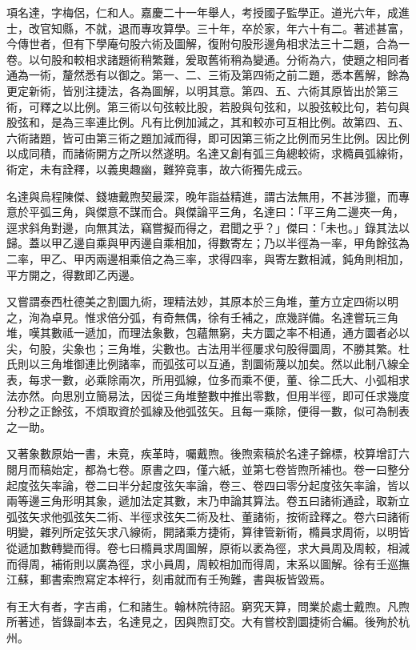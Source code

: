 \begin{pinyinscope}
項名達，字梅侶，仁和人。嘉慶二十一年舉人，考授國子監學正。道光六年，成進士，改官知縣，不就，退而專攻算學。三十年，卒於家，年六十有二。著述甚富，今傳世者，但有下學庵句股六術及圖解，復附句股形邊角相求法三十二題，合為一卷。以句股和較相求諸題術稍繁難，爰取舊術稍為變通。分術為六，使題之相同者通為一術，釐然悉有以御之。第一、二、三術及第四術之前二題，悉本舊解，餘為更定新術，皆別注捷法，各為圖解，以明其意。第四、五、六術其原皆出於第三術，可釋之以比例。第三術以句弦較比股，若股與句弦和，以股弦較比句，若句與股弦和，是為三率連比例。凡有比例加減之，其和較亦可互相比例。故第四、五、六術諸題，皆可由第三術之題加減而得，即可因第三術之比例而另生比例。因比例以成同積，而諸術開方之所以然遂明。名達又創有弧三角總較術，求橢員弧線術，術定，未有詮釋，以義奧趣幽，難猝竟事，故六術獨先成云。

名達與烏程陳傑、錢塘戴煦契最深，晚年詣益精進，謂古法無用，不甚涉獵，而專意於平弧三角，與傑意不謀而合。與傑論平三角，名達曰：「平三角二邊夾一角，逕求斜角對邊，向無其法，竊嘗擬而得之，君聞之乎？」傑曰：「未也。」錄其法以歸。蓋以甲乙邊自乘與甲丙邊自乘相加，得數寄左；乃以半徑為一率，甲角餘弦為二率，甲乙、甲丙兩邊相乘倍之為三率，求得四率，與寄左數相減，鈍角則相加，平方開之，得數即乙丙邊。

又嘗謂泰西杜德美之割圜九術，理精法妙，其原本於三角堆，董方立定四術以明之，洵為卓見。惟求倍分弧，有奇無偶，徐有壬補之，庶幾詳備。名達嘗玩三角堆，嘆其數祗一遞加，而理法象數，包蘊無窮，夫方圜之率不相通，通方圜者必以尖，句股，尖象也；三角堆，尖數也。古法用半徑屢求句股得圜周，不勝其繁。杜氏則以三角堆御連比例諸率，而弧弦可以互通，割圜術蔑以加矣。然以此制八線全表，每求一數，必乘除兩次，所用弧線，位多而乘不便，董、徐二氏大、小弧相求法亦然。向思別立簡易法，因從三角堆整數中推出零數，但用半徑，即可任求幾度分秒之正餘弦，不煩取資於弧線及他弧弦矢。且每一乘除，便得一數，似可為制表之一助。

又著象數原始一書，未竟，疾革時，囑戴煦。後煦索稿於名達子錦標，校算增訂六閱月而稿始定，都為七卷。原書之四，僅六紙，並第七卷皆煦所補也。卷一曰整分起度弦矢率論，卷二曰半分起度弦矢率論，卷三、卷四曰零分起度弦矢率論，皆以兩等邊三角形明其象，遞加法定其數，末乃申論其算法。卷五曰諸術通詮，取新立弧弦矢求他弧弦矢二術、半徑求弦矢二術及杜、董諸術，按術詮釋之。卷六曰諸術明變，雜列所定弦矢求八線術，開諸乘方捷術，算律管新術，橢員求周術，以明皆從遞加數轉變而得。卷七曰橢員求周圖解，原術以袤為徑，求大員周及周較，相減而得周，補術則以廣為徑，求小員周，周較相加而得周，末系以圖解。徐有壬巡撫江蘇，郵書索煦寫定本梓行，刻甫就而有壬殉難，書與板皆毀焉。

有王大有者，字吉甫，仁和諸生。翰林院待詔。窮究天算，問業於處士戴煦。凡煦所著述，皆錄副本去，名達見之，因與煦訂交。大有嘗校割圜捷術合編。後殉於杭州。


\end{pinyinscope}
